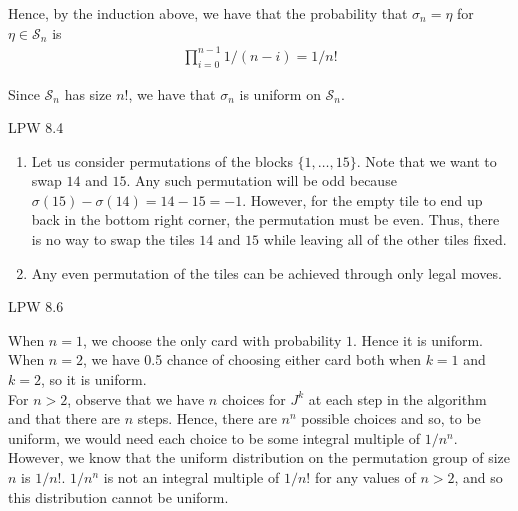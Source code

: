 \documentclass[12pt]{article}
\newenvironment{problem}[2][Problem]{\begin{trivlist}
\item[\hskip \labelsep {\bfseries #1}\hskip \labelsep {\bfseries #2.}]}{\end{trivlist}}
\begin{document}
Hence, by the induction above, we have that the probability that $\sigma_n = \eta$ for $\eta \in \mathcal{S}_n$ is
\begin{align*}
 \prod_{i=0}^{n-1} 1/(n-i) = 1/n!
\end{align*}

Since $\mathcal{S}_n$ has size $n!$, we have that $\sigma_n$ is uniform on $\mathcal{S}_n$.

\begin{problem}{II}
LPW 8.4
\end{problem}

\begin{enumerate}[label=\alph*)]

\item Let us consider permutations of the blocks $\{1, \ldots, 15\}$. Note that we want to swap $14$ and $15$. Any such permutation will be odd because $\sigma(15) - \sigma(14) = 14 - 15 = -1$. However, for the empty tile to end up back in the bottom right corner, the permutation must be even. Thus, there is no way to swap the tiles $14$ and $15$ while leaving all of the other tiles fixed.

\item Any even permutation of the tiles can be achieved through only legal moves.

\end{enumerate}

\begin{problem}{III}
LPW 8.6
\end{problem}

When $n = 1$, we choose the only card with probability $1$. Hence it is uniform. When $n = 2$, we have 0.5 chance of choosing either card both when $k = 1$ and $k = 2$, so it is uniform.\\

For $n > 2$, observe that we have $n$ choices for $J^k$ at each step in the algorithm and that there are $n$ steps. Hence, there are $n^n$ possible choices and so, to be uniform, we would need each choice to be some integral multiple of $1/n^n$. However, we know that the uniform distribution on the permutation group of size $n$ is $1/n!$. $1/n^n$ is not an integral multiple of $1/n!$ for any values of $n > 2$, and so this distribution cannot be uniform.
\end{document}
